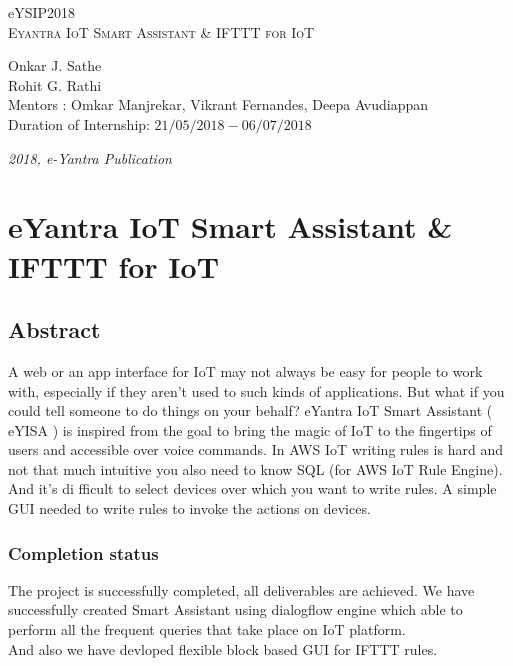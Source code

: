 \documentclass[a4paper,12pt,oneside]{book}
\begin{document}
\begin{titlepage}
\raggedright
{\Large eYSIP2018\\[1cm]}
{\Huge\scshape Eyantra IoT Smart Assistant \& IFTTT for IoT \\[.1in]}
\vfill
\begin{flushright}
{\large Onkar J. Sathe \\}
{\large Rohit G. Rathi \\}
{\large Mentors : Omkar Manjrekar, Vikrant Fernandes, Deepa Avudiappan \\}
{\large Duration of Internship: $ 21/05/2018-06/07/2018 $ \\}
\end{flushright}

{\itshape 2018, e-Yantra Publication}
\end{titlepage}

\chapter[Project Tag]{eYantra IoT Smart Assistant \& IFTTT for IoT}
\section*{Abstract}
A web or an app interface for IoT may not always
be easy for people to work with, especially if they
aren’t used to such kinds of applications.
But what if you could tell someone to do things
on your behalf?
eYantra IoT Smart Assistant ( eYISA ) is inspired
from the goal to bring the magic of IoT to the
fingertips of users and accessible over voice
commands.
In AWS IoT writing rules is hard and not
that much intuitive you also need to know
SQL (for AWS IoT Rule Engine).
And it’s di
fficult to select devices over which you
want to write rules. A simple GUI needed to write
rules to invoke the actions on devices.

\subsection*{Completion status}
The project is successfully completed, all deliverables are achieved. We have successfully created Smart Assistant using dialogflow engine which able to perform all the frequent
queries that take place on IoT platform. \\
And also we have devloped flexible block based GUI for IFTTT rules.
\end{document}
